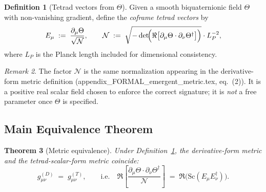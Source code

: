 \documentclass[12pt]{article}
\newtheorem{theorem}{Theorem}[section]
\theoremstyle{definition}
\newtheorem{definition}[theorem]{Definition}
\theoremstyle{remark}
\newtheorem{remark}[theorem]{Remark}
\begin{document}
\begin{definition}[Tetrad vectors from $\Theta$]
\label{def:tetrad_from_Theta}
Given a smooth biquaternionic field $\Theta$ with non-vanishing gradient, define the
\emph{coframe tetrad vectors} by
\begin{equation}
  E_\mu \;:=\; \frac{\partial_\mu\Theta}{\sqrt{\mathcal{N}}},
  \qquad
  \mathcal{N} \;:=\; \sqrt{-\det\!\Bigl(\Re\bigl[\partial_\mu\Theta\cdot\partial_\nu\Theta^\dagger\bigr]\Bigr)}
  \cdot L_P^{-2},
  \label{eq:tetrad_def}
\end{equation}
where $L_P$ is the Planck length included for dimensional consistency.
\end{definition}

\begin{remark}
The factor $\mathcal{N}$ is the same normalization appearing in the derivative-form metric
definition (appendix\_FORMAL\_emergent\_metric.tex, eq.~(2)). It is a positive real scalar
field chosen to enforce the correct signature; it is \emph{not} a free parameter once
$\Theta$ is specified.
\end{remark}

\subsection{Main Equivalence Theorem}

\begin{theorem}[Metric equivalence]
\label{thm:metric_equivalence}
Under Definition~\ref{def:tetrad_from_Theta}, the derivative-form metric and the
tetrad-scalar-form metric coincide:
\begin{equation}
  g_{\mu\nu}^{(D)} \;=\; g_{\mu\nu}^{(T)},
  \qquad
  \text{i.e.}\quad
  \Re\!\left[\frac{\partial_\mu\Theta\cdot\partial_\nu\Theta^\dagger}{\mathcal{N}}\right]
  \;=\;
  \Re\!\bigl(\mathrm{Sc}(E_\mu E_\nu^\dagger)\bigr).
  \label{eq:metric_equivalence}
\end{equation}
\end{theorem}
\end{document}
